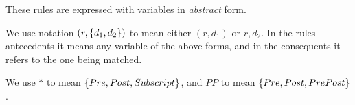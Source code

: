 These rules are expressed with variables in \emph{abstract} form.

We use notation $(r,\{d_1,d_2\})$
to mean either $(r,d_1)$ or $r,d_2$.
In the rules antecedents it means any variable of the above forms,
and in the consequents it refers to the one being matched.

We use $*$ to mean $\{Pre,Post,Subscript\}$,
and $PP$ to mean $\{Pre,Post,PrePost\}$.


\MRDECOR